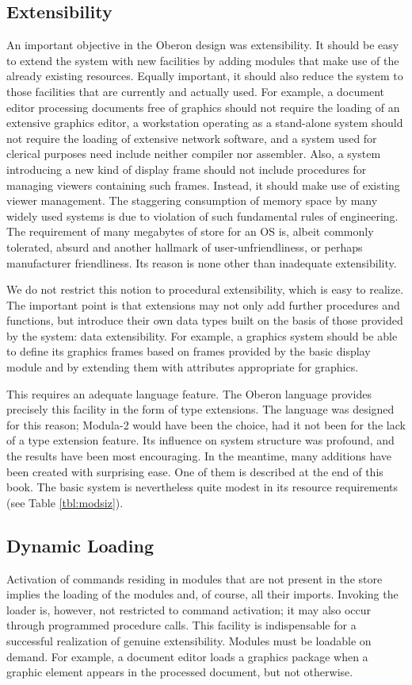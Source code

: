 \subsection{Extensibility}
An important objective in the Oberon design was extensibility. It should be easy to extend
the system with new facilities by adding modules that make use of the already existing resources.
Equally important, it should also reduce the system to those facilities that are currently
and actually used. For example, a document editor processing documents free of graphics
should not require the loading of an extensive graphics editor, a workstation operating as
a stand-alone system should not require the loading of extensive network software, and a
system used for clerical purposes need include neither compiler nor assembler. Also, a system
introducing a new kind of display frame should not include procedures for managing viewers
containing such frames. Instead, it should make use of existing viewer management. The
staggering consumption of memory space by many widely used systems is due to violation of
such fundamental rules of engineering. The requirement of many megabytes of store for an OS
is, albeit commonly tolerated, absurd and another hallmark of user-unfriendliness, or perhaps
manufacturer friendliness. Its reason is none other than inadequate extensibility.

We do not restrict this notion to procedural extensibility, which is easy to realize. The
important point is that extensions may not only add further procedures and functions, but
introduce their own data types built on the basis of those provided by the system: data
extensibility. For example, a graphics system should be able to define its graphics frames
based on frames provided by the basic display module and by extending them with attributes
appropriate for graphics.

This requires an adequate language feature. The Oberon language provides precisely this
facility in the form of type extensions. The language was designed for this reason; Modula-2
would have been the choice, had it not been for the lack of a type extension feature. Its
influence on system structure was profound, and the results have been most encouraging.
In the meantime, many additions have been created with surprising ease. One of them is
described at the end of this book. The basic system is nevertheless quite modest in its
resource requirements (see Table \ref{tbl:modsiz}).

\subsection{Dynamic Loading}
Activation of commands residing in modules that are not present in the store implies the
loading of the modules and, of course, all their imports. Invoking the loader is, however,
not restricted to command activation; it may also occur through programmed procedure calls.
This facility is indispensable for a successful realization of genuine extensibility.
Modules must be loadable on demand. For example, a document editor loads a graphics package
when a graphic element appears in the processed document, but not otherwise.

